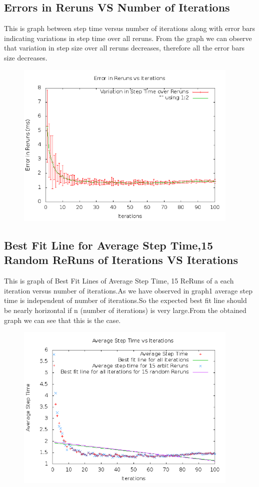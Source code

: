 \documentclass[11pt]{article}
\begin{document}
\subsection{Errors in Reruns VS Number of Iterations}
This is graph between step time versus number of iterations along with error bars indicating variations in step time over all reruns.
From the graph we can observe that variation in step size over all reruns decreases, therefore all the error bars size decreases.
\begin{figure}[H]
\centering
\includegraphics[height=8cm]{g23_plot03.png}
\end{figure}

\subsection{Best Fit Line for Average Step Time,15 Random ReRuns of Iterations VS Iterations}
This is graph of Best Fit Lines of Average Step Time, 15 ReRuns of a each iteration versus number of iterations.As we have observed in graph1 average step time is independent of number of iterations.So the expected best fit line should be nearly horizontal if n (number of iterations) is very large.From the obtained graph we can see that this is the case.
\begin{figure}[H]
\centering
\includegraphics[height=8cm]{g23_plot04.png}
\end{figure}
\end{document}

